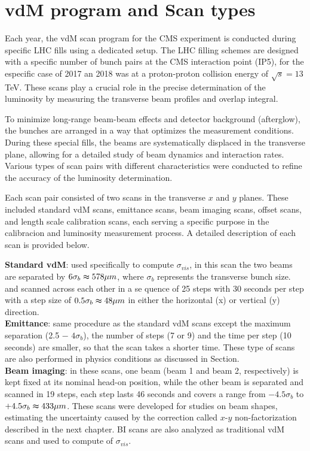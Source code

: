 \section{vdM program and Scan types}
\label{vdM program and Scan types}

Each year, the vdM scan program for the CMS experiment is conducted during specific LHC fills using a dedicated setup. The LHC filling schemes are designed with a specific number of bunch pairs at the CMS interaction point (IP5), for the especific case of 2017 an 2018 was at a proton-proton collision energy of \(\sqrt{s} = 13\) TeV. These scans play a crucial role in the precise determination of the luminosity by measuring the transverse beam profiles and overlap integral.  

To minimize long-range beam-beam effects and detector background (afterglow), the bunches are arranged in a way that optimizes the measurement conditions. During these special fills, the beams are systematically displaced in the transverse plane, allowing for a detailed study of beam dynamics and interaction rates. Various types of scan pairs with different characteristics were conducted to refine the accuracy of the luminosity determination.  

Each scan pair consisted of two scans in the transverse \(x\) and \(y\) planes. These included standard vdM scans, emittance scans, beam imaging scans, offset scans, and length scale calibration scans, each serving a specific purpose in the calibracion and luminosity measurement process. A detailed description of each scan is provided below.  

\noindent \textbf{Standard vdM}: used specifically to compute $\sigma_{vis}$, in this scan the two beams are separated by $6\sigma_{b} \thickapprox 578\mu m$, where $\sigma_{b}$ represents the transverse bunch size. and scanned across each other in a se quence of 25 steps with 30 seconds per step with a step size of $0.5\sigma_{b} \thickapprox 48 \mu m$ in either the horizontal (x) or vertical (y) direction.\\

\noindent \textbf{Emittance}: same procedure as the standard vdM scans except the maximum separation (2.5 − $4 \sigma_{b}$), the number of steps (7 or 9) and the time per step (10 seconds) are smaller, so that the scan takes a shorter time. These type of scans are also performed in physics conditions as discussed in Section.\\
 
\noindent \textbf{Beam imaging}: in these scans, one beam (beam 1 and beam 2, respectively) is kept fixed at its nominal head-on position, while the other beam is separated and scanned in 19 steps, each step lasts 46 seconds and covers a range from $-4.5\sigma_{b}$ to $+4.5\sigma_{b} \thickapprox 433 \mu m$. These scans were developed for studies on beam shapes, estimating the uncertainty caused by the correction called $x$-$y$ non-factorization described in the next chapter. BI scans are also analyzed as traditional vdM scans and used to compute of $\sigma_{vis}$.\\
 
